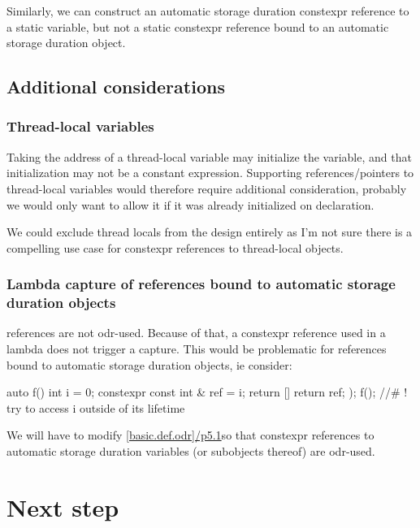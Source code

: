 \documentclass{wg21}
\begin{document}
Similarly, we can construct an automatic storage duration constexpr reference to a static variable, but not a static constexpr reference bound to an automatic storage duration object.

\subsection{Additional considerations}

\subsubsection{Thread-local variables}

Taking the address of a thread-local variable may initialize the variable, and that initialization may not be a constant expression.
Supporting references/pointers to thread-local variables would therefore require additional consideration, probably we would only want to allow it if it was already initialized
on declaration.

We could exclude thread locals from the design entirely as I'm not sure there is a compelling use case for constexpr references to thread-local objects.

\subsubsection{Lambda capture of  references bound to automatic storage duration objects}

 references are not odr-used.  Because of that, a constexpr reference used in a lambda does not trigger a capture.
This would be problematic for references bound to automatic storage duration objects, ie consider:

\begin{colorblock}
auto f() {
    int i = 0;
    constexpr const int & ref = i;
    return [] {
        return ref;
    });
}
f(); //# ! try to access i outside of its lifetime
\end{colorblock}

We will have to modify \href{http://eel.is/c++draft/basic.def.odr#5.1}{[basic.def.odr]/p5.1}so that constexpr references to automatic storage duration variables (or subobjects thereof) are odr-used.

\section{Next step}
\end{document}
